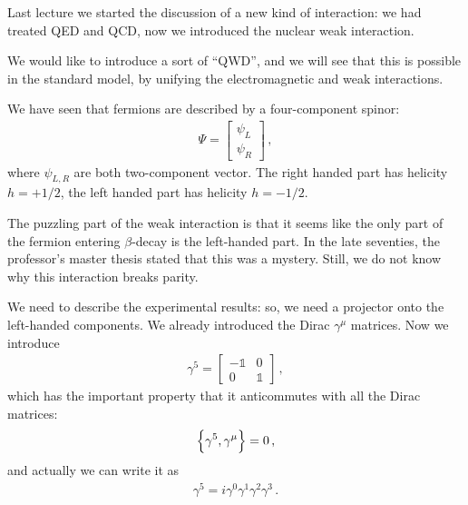 \documentclass[main.tex]{subfiles}
\begin{document}

Last lecture we started the discussion of a new kind of interaction: we had treated QED and QCD, now we introduced the nuclear weak interaction. 

We would like to introduce a sort of ``QWD'', and we will see that this is possible in the standard model, by unifying the electromagnetic and weak interactions. 

We have seen that fermions are described by a four-component spinor: 
%
\begin{subequations}
\begin{align}
\Psi = \left[\begin{array}{c}
\psi_{L} \\ 
\psi_{R}
\end{array}\right]
\,,
\end{align}
\end{subequations}
%
where \(\psi_{L, R}\) are both two-component vector. The right handed part has helicity \(h = + 1/ 2\), the left handed part has helicity \(h = - 1 / 2\).

The puzzling part of the weak interaction is that it seems like the only part of the fermion entering \(\beta \)-decay is the left-handed part.
In the late seventies, the professor's master thesis stated that this was a mystery. Still, we do not know why this interaction breaks parity. 

We need to describe the experimental results: so, we need a projector onto the left-handed components. 
We already introduced the Dirac \(\gamma^{\mu }\) matrices. 
Now we introduce 
%
\begin{subequations}
\begin{align}
\gamma^{5} = \left[\begin{array}{cc}
- \mathbb{1} & 0 \\ 
0 & \mathbb{1}
\end{array}\right]
\,,
\end{align}
\end{subequations}
%
which has the important property that it anticommutes with all the Dirac matrices: 
%
\begin{align}
\qty{\gamma^{5}, \gamma^{\mu }} = 0 
\,,
\end{align}
%
and actually we can write it as 
%
\begin{align}
\gamma^{5} = i \gamma^{0}\gamma^{1}\gamma^{2}\gamma^{3}
\,.
\end{align}
\end{document}
